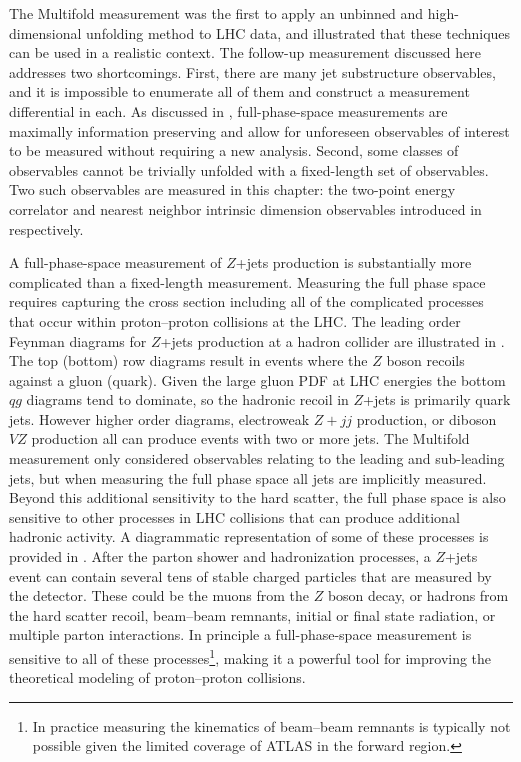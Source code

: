 The Multifold measurement was the first to apply an unbinned and high-dimensional unfolding method to LHC data, and illustrated that these techniques can be used in a realistic context.
The follow-up measurement discussed here addresses two shortcomings.
First, there are many jet substructure observables, and it is impossible to enumerate all of them and construct a measurement differential in each.
As discussed in , full-phase-space measurements are maximally information preserving and allow for unforeseen observables of interest to be measured without requiring a new analysis.
Second, some classes of observables cannot be trivially unfolded with a fixed-length set of observables.
Two such observables are measured in this chapter: the two-point energy correlator and nearest neighbor intrinsic dimension observables introduced in  respectively.

A full-phase-space measurement of $Z$+jets production is substantially more complicated than a fixed-length measurement.
Measuring the full phase space requires capturing the cross section including all of the complicated processes that occur within proton--proton collisions at the LHC.
The leading order Feynman diagrams for $Z$+jets production at a hadron collider are illustrated in .
The top (bottom) row diagrams result in events where the $Z$ boson recoils against a gluon (quark).
Given the large gluon PDF at LHC energies the bottom $qg$ diagrams tend to dominate, so the hadronic recoil in $Z$+jets is primarily quark jets.
However higher order diagrams, electroweak $Z+jj$ production, or diboson $VZ$ production all can produce events with two or more jets.
The Multifold measurement only considered observables relating to the leading and sub-leading jets, but when measuring the full phase space all jets are implicitly measured.
Beyond this additional sensitivity to the hard scatter, the full phase space is also sensitive to other processes in LHC collisions that can produce additional hadronic activity.
A diagrammatic representation of some of these processes is provided in .
After the parton shower and hadronization processes, a $Z$+jets event can contain several tens of stable charged particles that are measured by the detector.
These could be the muons from the $Z$ boson decay, or hadrons from the hard scatter recoil, beam--beam remnants, initial or final state radiation, or multiple parton interactions.
In principle a full-phase-space measurement is sensitive to all of these processes\footnote{In practice measuring the kinematics of beam--beam remnants is typically not possible given the limited coverage of ATLAS in the forward region.}, making it a powerful tool for improving the theoretical modeling of proton--proton collisions.


